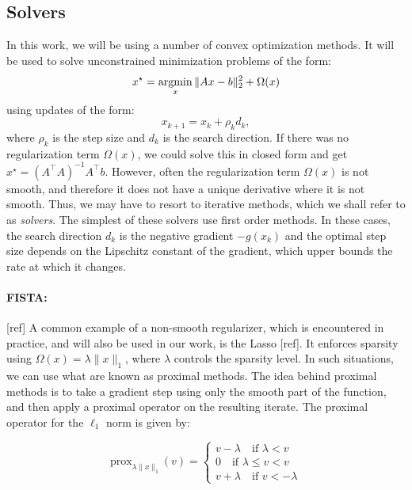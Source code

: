 \subsection{Solvers}
In this work, we will be using a number of convex optimization methods. It will be used to solve unconstrained minimization problems of the form:
\begin{equation}
x^{\star} = \mathop{\mathrm{argmin}}_x \|Ax - b\|_{2}^2 + \Omega(x)
\end{equation}
%
using updates of the form:
%
\begin{equation}
x_{k + 1} = x_{k} + \rho_k d_k,
\end{equation}
%
where $\rho_k$ is the step size and $d_k$ is the search direction.
If there was no regularization term $\Omega(x)$, we could solve this in closed form and get $x^{\star} = {(A^{\top}A)}^{-1}A^{\top}b$. However, often the regularization term $\Omega(x)$ is not smooth, and therefore it does not have a unique derivative where it is not smooth. Thus, we may have to resort to iterative methods, which we shall refer to as \emph{solvers}. The simplest of these solvers use first order methods. In these cases, the search direction $d_k$ is the negative gradient $-g(x_k)$ and the optimal step size depends on the Lipschitz constant of the gradient, which upper bounds the rate at which it changes. 

\paragraph{FISTA: }[ref] A common example of a non-smooth regularizer, which is encountered in practice, and will also be used in our work, is the Lasso [ref]. It enforces sparsity using $\Omega(x) = \lambda \|x\|_1$, where $\lambda$ controls the sparsity level. In such situations, we can use what are known as proximal methods. The idea behind proximal methods is to take a gradient step using only the smooth part of the function, and then apply a proximal operator on the resulting iterate. The proximal operator for the $\ell_1$ norm is given by:

\begin{equation}
\mathrm{prox}_{\lambda \|x\|_1}(v) = \begin{cases}
v - \lambda \quad \text{if } \lambda < v \\
0 \quad \text{if } \lambda \leq v < v\\
v + \lambda \quad \text{if } v < -\lambda
\end{cases}
\end{equation}

